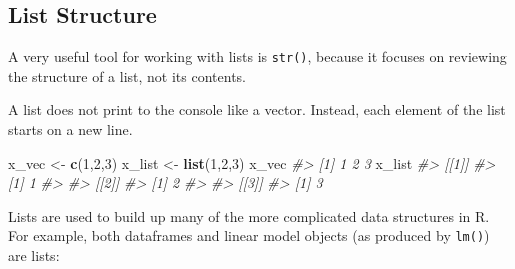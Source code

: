 \documentclass[]{book}
\newenvironment{Shaded}{\begin{snugshade}}{\end{snugshade}}
\newcommand{\KeywordTok}[1]{\textcolor[rgb]{0.13,0.29,0.53}{\textbf{#1}}}
\newcommand{\DataTypeTok}[1]{\textcolor[rgb]{0.13,0.29,0.53}{#1}}
\newcommand{\DecValTok}[1]{\textcolor[rgb]{0.00,0.00,0.81}{#1}}
\newcommand{\StringTok}[1]{\textcolor[rgb]{0.31,0.60,0.02}{#1}}
\newcommand{\CommentTok}[1]{\textcolor[rgb]{0.56,0.35,0.01}{\textit{#1}}}
\newcommand{\OperatorTok}[1]{\textcolor[rgb]{0.81,0.36,0.00}{\textbf{#1}}}
\newcommand{\NormalTok}[1]{#1}
\begin{document}
\subsection{List Structure}\label{list-structure}

A very useful tool for working with lists is \texttt{str()}, because it
focuses on reviewing the structure of a list, not its contents.

\begin{Shaded}
\end{Shaded}

A list does not print to the console like a vector. Instead, each
element of the list starts on a new line.

\begin{Shaded}
\begin{Highlighting}[]
\NormalTok{x_vec <-}\StringTok{ }\KeywordTok{c}\NormalTok{(}\DecValTok{1}\NormalTok{,}\DecValTok{2}\NormalTok{,}\DecValTok{3}\NormalTok{)}
\NormalTok{x_list <-}\StringTok{ }\KeywordTok{list}\NormalTok{(}\DecValTok{1}\NormalTok{,}\DecValTok{2}\NormalTok{,}\DecValTok{3}\NormalTok{)}
\NormalTok{x_vec}
\CommentTok{#> [1] 1 2 3}
\NormalTok{x_list}
\CommentTok{#> [[1]]}
\CommentTok{#> [1] 1}
\CommentTok{#> }
\CommentTok{#> [[2]]}
\CommentTok{#> [1] 2}
\CommentTok{#> }
\CommentTok{#> [[3]]}
\CommentTok{#> [1] 3}
\end{Highlighting}
\end{Shaded}

Lists are used to build up many of the more complicated data structures
in R. For example, both dataframes and linear model objects (as produced
by \texttt{lm()}) are lists:
\end{document}
